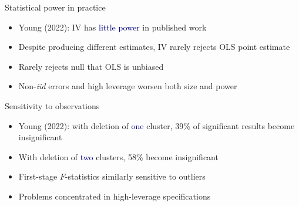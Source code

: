 \documentclass[aspectratio=169]{beamer}
\begin{document}
\begin{frame}

Statistical power in practice

\bigskip

\begin{itemize}
\itemsep1.5em
\item<2-> Young (2022): IV has \textcolor{navy}{little power} in published work

\item<3-> Despite producing different estimates, IV rarely rejects OLS point estimate

\item<4-> Rarely rejects null that OLS is unbiased

\item<5-> Non-\textit{iid} errors and high leverage worsen both size and power
\end{itemize}

\end{frame}

\begin{frame}

Sensitivity to observations

\bigskip

\begin{itemize}
\itemsep1.5em
\item<2-> Young (2022): with deletion of \textcolor{navy}{one} cluster, 39\% of significant results become insignificant

\item<3-> With deletion of \textcolor{navy}{two} clusters, 58\% become insignificant

\item<4-> First-stage $F$-statistics similarly sensitive to outliers

\item<5-> Problems concentrated in high-leverage specifications
\end{itemize}

\end{frame}
\end{document}
